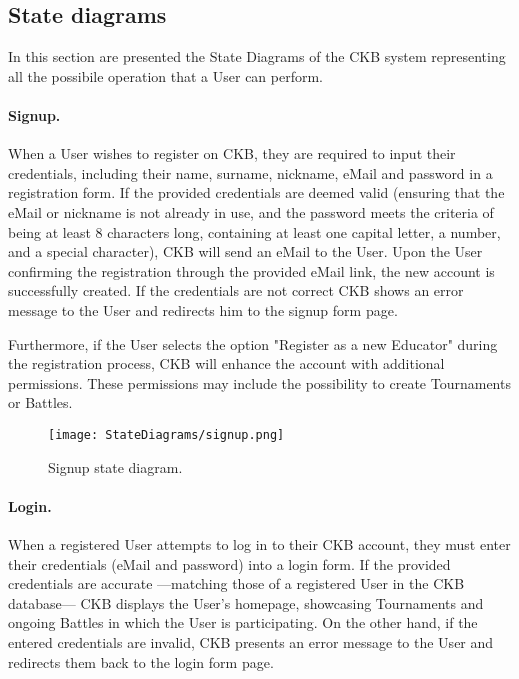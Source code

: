 \subsection{State diagrams}
\label{subsec:state_diagrams}%
In this section are presented the State Diagrams of the CKB system representing all the possibile operation that a User can perform.
\paragraph{Signup.}
When a User wishes to register on CKB, they are required to input their credentials, including their name, surname, nickname, eMail and password in a registration form. If the provided credentials are deemed valid (ensuring that the eMail or nickname is not already in use, and the password meets the criteria of being at least 8 characters long, containing at least one capital letter, a number, and a special character), CKB will send an eMail to the User. Upon the User confirming the registration through the provided eMail link, the new account is successfully created. If the credentials are not correct CKB shows an error message to the User and redirects him to the signup form page.

Furthermore, if the User selects the option "Register as a new Educator" during the registration process, CKB will enhance the account with additional permissions. These permissions may include the possibility to create Tournaments or Battles.

\begin{figure}[H]
    \begin{center}
        \texttt{[image: StateDiagrams/signup.png]}
        \caption{Signup state diagram.}
        \label{fig:signup_sd}%
    \end{center}
\end{figure}

\paragraph{Login.}
When a registered User attempts to log in to their CKB account, they must enter their credentials (eMail and password) into a login form. If the provided credentials are accurate —matching those of a registered User in the CKB database— CKB displays the User's homepage, showcasing Tournaments and ongoing Battles in which the User is participating. On the other hand, if the entered credentials are invalid, CKB presents an error message to the User and redirects them back to the login form page.

